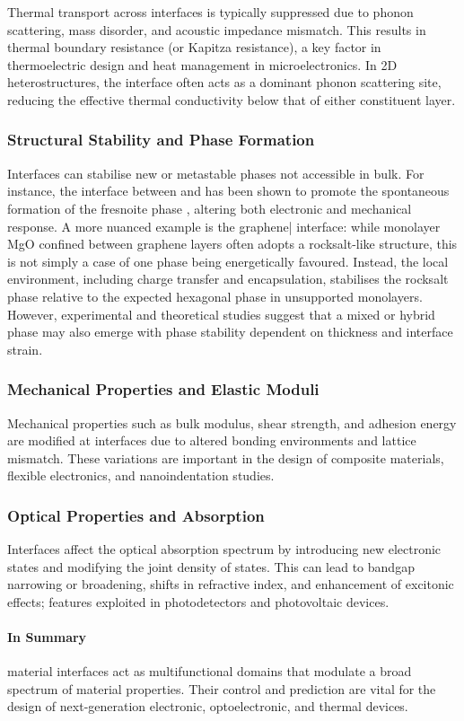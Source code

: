 Thermal transport across interfaces is typically suppressed due to phonon scattering, mass disorder, and acoustic impedance mismatch. This results in thermal boundary resistance (or Kapitza resistance), a key factor in thermoelectric design and heat management in microelectronics. In 2D heterostructures, the interface often acts as a dominant phonon scattering site, reducing the effective thermal conductivity below that of either constituent layer.

\subsubsection{Structural Stability and Phase Formation}

Interfaces can stabilise new or metastable phases not accessible in bulk. For instance, the interface between  and  has been shown to promote the spontaneous formation of the fresnoite phase , altering both electronic and mechanical response. A more nuanced example is the graphene| interface: while monolayer MgO confined between graphene layers often adopts a rocksalt-like structure, this is not simply a case of one phase being energetically favoured. Instead, the local environment, including charge transfer and encapsulation, stabilises the rocksalt phase relative to the expected hexagonal phase in unsupported monolayers. However, experimental and theoretical studies suggest that a mixed or hybrid phase may also emerge with phase stability dependent on thickness and interface strain.

\subsubsection{Mechanical Properties and Elastic Moduli}

Mechanical properties such as bulk modulus, shear strength, and adhesion energy are modified at interfaces due to altered bonding environments and lattice mismatch. These variations are important in the design of composite materials, flexible electronics, and nanoindentation studies.

\subsubsection{Optical Properties and Absorption}

Interfaces affect the optical absorption spectrum by introducing new electronic states and modifying the joint density of states. This can lead to bandgap narrowing or broadening, shifts in refractive index, and enhancement of excitonic effects; features exploited in photodetectors and photovoltaic devices.

\paragraph{In Summary} material interfaces act as multifunctional domains that modulate a broad spectrum of material properties. Their control and prediction are vital for the design of next-generation electronic, optoelectronic, and thermal devices.